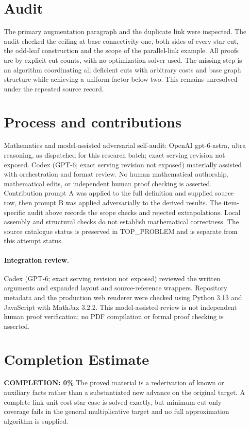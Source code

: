 \documentclass[11pt]{article}
\begin{document}
\section{Audit}
The primary augmentation paragraph and the duplicate link were
inspected. The audit checked the ceiling at base connectivity one,
both sides of every star cut, the odd-leaf construction and the
scope of the parallel-link example. All proofs are by explicit
cut counts, with no optimization solver used. The missing step is
an algorithm coordinating all deficient cuts with arbitrary costs
and base graph structure while achieving a uniform factor below
two. This remains unresolved under the repeated source record.

\section{Process and contributions}
Mathematics and model-assisted adversarial self-audit: OpenAI gpt-6-astra, ultra reasoning, as dispatched for this research batch; exact serving revision not exposed. Codex (GPT-6; exact serving revision not exposed) materially assisted with orchestration and format review. No human mathematical authorship, mathematical edits, or independent human proof checking is asserted.
Contribution prompt A was applied to the full definition and supplied source row, then prompt B was applied adversarially to the derived results. The item-specific audit above records the scope checks and rejected extrapolations. Local assembly and structural checks do not establish mathematical correctness. The source catalogue status is preserved in TOP\_PROBLEM and is separate from this attempt status.
\paragraph{Integration review.} Codex (GPT-6; exact serving revision not exposed) reviewed the written arguments and expanded layout and source-reference wrappers. Repository metadata and the production web renderer were checked using Python 3.13 and JavaScript with MathJax 3.2.2. This model-assisted review is not independent human proof verification; no PDF compilation or formal proof checking is asserted.

\section{Completion Estimate}
\noindent\textbf{COMPLETION: 0\%}
The proved material is a rederivation of known or auxiliary facts rather than a substantiated new advance on the original target. A complete-link unit-cost star case is solved exactly, but minimum-cut-only coverage fails in the general multiplicative target and no full approximation algorithm is supplied.
\end{document}
